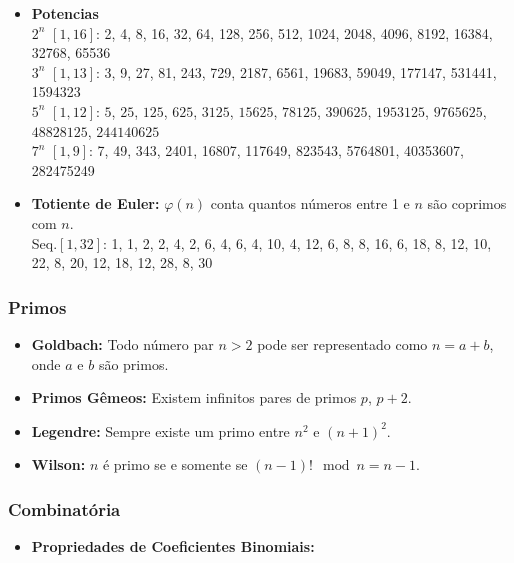 \begin{small}
\begin{itemize}
    \item\textbf{Potencias}
    \\
    \textbf{$2^n$} $[1,16]$: 
    2, 4, 8, 16, 32, 64, 128, 256, 512, 1024, 2048, 4096, 8192, 16384, 32768, 65536
    \\
    \textbf{$3^n$} $[1,13]$: 3, 9, 27, 81, 243, 729, 2187, 6561, 19683, 59049, 177147, 531441, 1594323
    \\
    \textbf{$5^n$} $[1,12]$: 
    $5$, $25$, $125$, $625$, $3125$, $15625$, $78125$, $390625$, $1953125$, $9765625$, $48828125$, $244140625$
    \\
    \textbf{$7^n$} $[1,9]$: 
    7, 49, 343, 2401, 16807, 117649, 823543, 5764801, 40353607, 282475249

    \item\textbf{Totiente de Euler:} $\varphi(n)$ conta quantos números entre 1 e $n$ são coprimos com $n$. \\
    Seq.$[1,32]$: 1, 1, 2, 2, 4, 2, 6, 4, 6, 4, 10, 4, 12, 6, 8, 8, 16, 6, 18, 8, 12, 10, 22, 8, 20, 12, 18, 12, 28, 8, 30
    
\end{itemize}
\subsubsection*{Primos}
\begin{itemize}
    \item\textbf{Goldbach:} Todo número par $n > 2$ pode ser representado como $n = a + b$, onde $a$ e $b$ são primos.

    \item\textbf{Primos Gêmeos:} Existem infinitos pares de primos $p$, $p + 2$.

    \item\textbf{Legendre:} Sempre existe um primo entre $n^2$ e $(n+1)^2$.

    \item\textbf{Wilson:} $n$ é primo se e somente se $(n-1)! \mod n = n - 1$.

\end{itemize}
\subsubsection*{Combinatória}
\begin{itemize}

    \item \textbf{Propriedades de Coeficientes Binomiais:}


\end{itemize}
\end{small}
